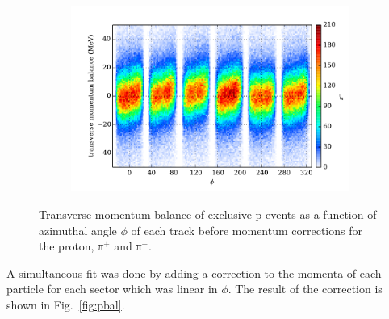 \begin{figure}
\begin{center}
\begin{subfigure}{0.4\columnwidth}
\end{subfigure}
\begin{subfigure}{0.4\columnwidth}
    \includegraphics[width=\columnwidth]{figures/pcor/pcor_mptbal_pim.pdf}
\end{subfigure}
\caption[Momentum Balance Before Corrections]{\label{fig:pbal.before}Transverse momentum balance of exclusive p \π[+] \π[-] events as a function of azimuthal angle $\phi$ of each track before momentum corrections for the proton, π$^+$ and π$^-$.}
\end{center}\end{figure}

A simultaneous fit was done by adding a correction to the momenta of each particle for each sector which was linear in $\phi$. The result of the correction is shown in Fig.~\ref{fig:pbal}.

